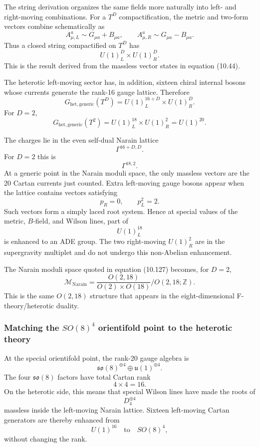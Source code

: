 \documentclass[
  10pt,
  a4paper,
  openany]{book}
\begin{document}
The string derivation organizes the same fields more naturally into
left- and right-moving combinations. For a \(T^D\) compactification, the
metric and two-form vectors combine schematically as \[
A^a_{\mu,L}
\sim G_{\mu a}+B_{\mu a},
\qquad
A^a_{\mu,R}
\sim G_{\mu a}-B_{\mu a}.
\] Thus a closed string compactified on \(T^D\) has \[
U(1)^D_L\times U(1)^D_R.
\] This is the result derived from the massless vector states in
equation (10.44).

The heterotic left-moving sector has, in addition, sixteen chiral
internal bosons whose currents generate the rank-16 gauge lattice.
Therefore \[
\boxed{
G_{\mathrm{het,generic}}(T^D)
=U(1)^{16+D}_L\times U(1)^D_R
}.
\] For \(D=2\), \[
\boxed{
G_{\mathrm{het,generic}}(T^2)
=U(1)^{18}_L\times U(1)^2_R
=U(1)^{20}
}.
\]

The charges lie in the even self-dual Narain lattice \[
\Gamma^{16+D,D}.
\] For \(D=2\) this is \[
\Gamma^{18,2}.
\] At a generic point in the Narain moduli space, the only massless
vectors are the 20 Cartan currents just counted. Extra left-moving gauge
bosons appear when the lattice contains vectors satisfying \[
p_R=0,
\qquad
p_L^2=2.
\] Such vectors form a simply laced root system. Hence at special values
of the metric, \(B\)-field, and Wilson lines, part of \[
U(1)^{18}_L
\] is enhanced to an ADE group. The two right-moving \(U(1)^2_R\) are in
the supergravity multiplet and do not undergo this non-Abelian
enhancement.

The Narain moduli space quoted in equation (10.127) becomes, for
\(D=2\), \[
\mathcal M_{\mathrm{Narain}}
=
\frac{O(2,18)}
{O(2)\times O(18)}
\Big/
O(2,18;\mathbb Z).
\] This is the same \(O(2,18)\) structure that appears in the
eight-dimensional F-theory/heterotic duality.

\subsubsection{\texorpdfstring{Matching the \(SO(8)^4\) orientifold
point to the heterotic
theory}{Matching the SO(8)\^{}4 orientifold point to the heterotic theory}}\label{matching-the-so84-orientifold-point-to-the-heterotic-theory}

At the special orientifold point, the rank-20 gauge algebra is \[
\boxed{
\mathfrak{so}(8)^{\oplus4}
\oplus
\mathfrak u(1)^{\oplus4}
}.
\] The four \(\mathfrak{so}(8)\) factors have total Cartan rank \[
4\times4=16.
\] On the heterotic side, this means that special Wilson lines have made
the roots of \[
D_4^{\oplus4}
\] massless inside the left-moving Narain lattice. Sixteen left-moving
Cartan generators are thereby enhanced from \[
U(1)^{16}
\quad\text{to}\quad
SO(8)^4,
\] without changing the rank.
\end{document}
